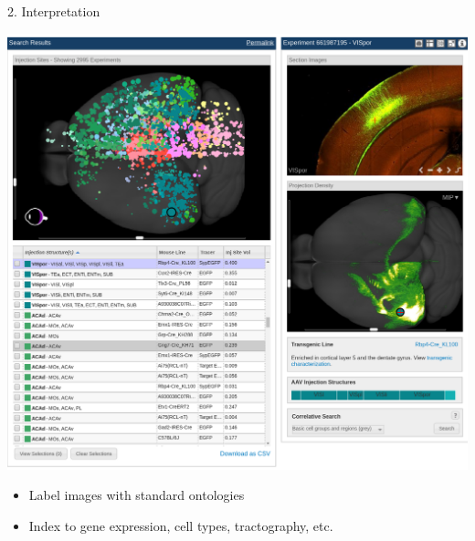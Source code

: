 \documentclass{beamer}
\begin{document}
\begin{frame}{2. Interpretation}
\begin{minipage}{0.7\textwidth}
\includegraphics[width=\textwidth,clip,trim=1in 6in 1in 1.5in]{allen-connectivity}
\end{minipage}

\begin{itemize}

\item
Label images with standard ontologies

\item
Index to gene expression, cell types, tractography, etc.

\end{itemize}
\end{frame}
\end{document}
